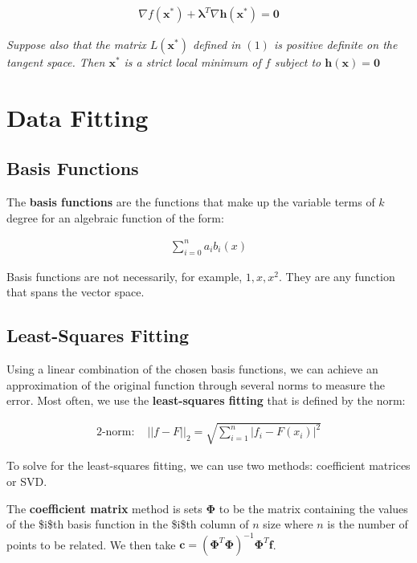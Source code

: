 \documentclass[11pt]{article}
\begin{document}
\begin{align*}
    \nabla f\left(\boldsymbol{x}^{*}\right) + \boldsymbol{\lambda}^{T}\nabla\boldsymbol{h}\left(\boldsymbol{x}^{*}\right) = \boldsymbol{0}
\end{align*}

\emph{Suppose also that the matrix \(L\left(\boldsymbol{x}^{*}\right)\) defined in \(\left(1\right)\) is positive definite on the tangent space. Then \(\boldsymbol{x}^{*}\) is a strict local minimum of \(f\) subject to \(\boldsymbol{h}\left(\boldsymbol{x}\right) = \boldsymbol{0}\)}

\section{Data Fitting}
\label{sec:org2bf68d3}
\subsection{Basis Functions}
\label{sec:org6cbb970}
The \textbf{basis functions} are the functions that make up the variable terms of \(k\) degree for an algebraic function of the form:

\begin{align*}
    \sum_{i = 0}^{n} a_{i}b_{i}\left(x\right)
\end{align*}

Basis functions are not necessarily, for example, \(1, x, x^{2}\). They are any function that spans the vector space.

\subsection{Least-Squares Fitting}
\label{sec:orgf762e70}
Using a linear combination of the chosen basis functions, we can achieve an approximation of the original function through several norms to measure the error. Most often, we use the \textbf{least-squares fitting} that is defined by the norm:

\begin{align*}
    2\text{-norm: } &\lvert\lvert f - F \lvert\lvert_{2} = \sqrt{\sum_{i=1}^{n} \lvert f_{i} - F\left(x_{i}\right)\rvert^{2}}
\end{align*}

To solve for the least-squares fitting, we can use two methods: coefficient matrices or SVD.

The \textbf{coefficient matrix} method is sets \(\boldsymbol{\Phi}\) to be the matrix containing the values of the \$i\$th basis function in the \$i\$th column of \(n\) size where \(n\) is the number of points to be related. We then take \(\boldsymbol{c} = \left(\boldsymbol{\Phi}^{T}\boldsymbol{\Phi}\right)^{-1}\boldsymbol{\Phi}^{T}\boldsymbol{f}\).
\end{document}
